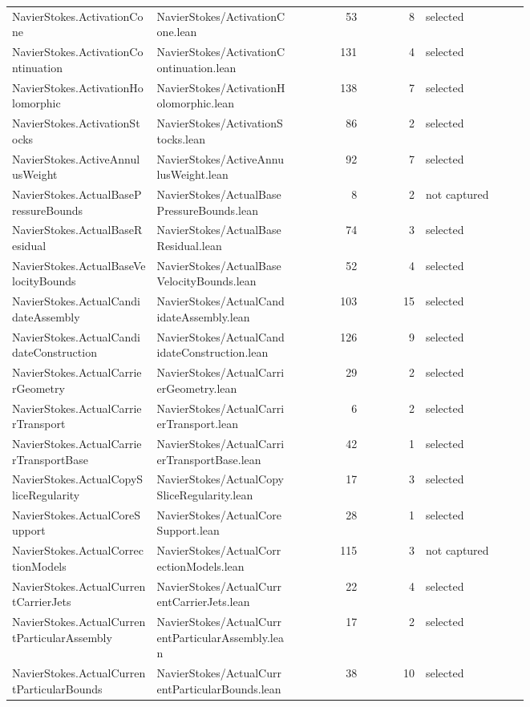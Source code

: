 \documentclass[10pt]{article}
\begin{document}
\begin{longtable}{p{0.28\linewidth}p{0.27\linewidth}r r p{0.20\linewidth}}
NavierStokes.ActivationCone & NavierStokes/ActivationCone.lean & 53 & 8 & selected\\
NavierStokes.ActivationContinuation & NavierStokes/ActivationContinuation.lean & 131 & 4 & selected\\
NavierStokes.ActivationHolomorphic & NavierStokes/ActivationHolomorphic.lean & 138 & 7 & selected\\
NavierStokes.ActivationStocks & NavierStokes/ActivationStocks.lean & 86 & 2 & selected\\
NavierStokes.ActiveAnnulusWeight & NavierStokes/ActiveAnnulusWeight.lean & 92 & 7 & selected\\
NavierStokes.ActualBasePressureBounds & NavierStokes/ActualBasePressureBounds.lean & 8 & 2 & not captured\\
NavierStokes.ActualBaseResidual & NavierStokes/ActualBaseResidual.lean & 74 & 3 & selected\\
NavierStokes.ActualBaseVelocityBounds & NavierStokes/ActualBaseVelocityBounds.lean & 52 & 4 & selected\\
NavierStokes.ActualCandidateAssembly & NavierStokes/ActualCandidateAssembly.lean & 103 & 15 & selected\\
NavierStokes.ActualCandidateConstruction & NavierStokes/ActualCandidateConstruction.lean & 126 & 9 & selected\\
NavierStokes.ActualCarrierGeometry & NavierStokes/ActualCarrierGeometry.lean & 29 & 2 & selected\\
NavierStokes.ActualCarrierTransport & NavierStokes/ActualCarrierTransport.lean & 6 & 2 & selected\\
NavierStokes.ActualCarrierTransportBase & NavierStokes/ActualCarrierTransportBase.lean & 42 & 1 & selected\\
NavierStokes.ActualCopySliceRegularity & NavierStokes/ActualCopySliceRegularity.lean & 17 & 3 & selected\\
NavierStokes.ActualCoreSupport & NavierStokes/ActualCoreSupport.lean & 28 & 1 & selected\\
NavierStokes.ActualCorrectionModels & NavierStokes/ActualCorrectionModels.lean & 115 & 3 & not captured\\
NavierStokes.ActualCurrentCarrierJets & NavierStokes/ActualCurrentCarrierJets.lean & 22 & 4 & selected\\
NavierStokes.ActualCurrentParticularAssembly & NavierStokes/ActualCurrentParticularAssembly.lean & 17 & 2 & selected\\
NavierStokes.ActualCurrentParticularBounds & NavierStokes/ActualCurrentParticularBounds.lean & 38 & 10 & selected\\

\end{longtable}
\end{document}
